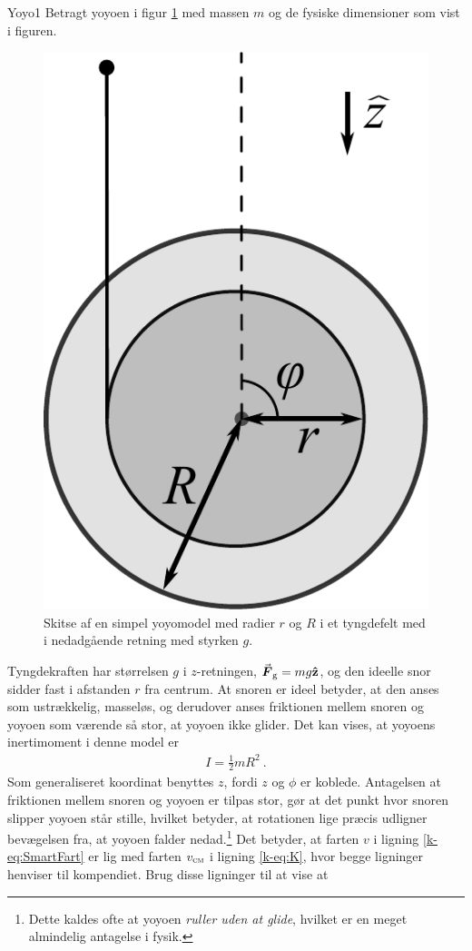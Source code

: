 \begin{opgave}{Yoyo}{1} \label{opg:Yoyo}
Betragt yoyoen i figur \ref{fig:yoyo} med massen $m$ og de fysiske dimensioner som vist i figuren.
%
\begin{figure}[]
	\centering
	\includegraphics[width=.61\columnwidth]{Analytisk-Mekanik/yoyo.pdf}
	\caption{Skitse af en simpel yoyomodel med radier $r$ og $R$ i et tyngdefelt med i nedadgående retning med styrken $g$.} \label{fig:yoyo}
\end{figure}
%
Tyngdekraften har størrelsen $g$ i $z$-retningen, ${\vec{\boldsymbol{F}}}_\mathrm{g} = mg\mathbf{\hat{z}}$, og den ideelle snor sidder fast i afstanden $r$ fra centrum. At snoren er ideel betyder, at den anses som ustrækkelig, masseløs, og derudover anses friktionen mellem snoren og yoyoen som værende så stor, at yoyoen ikke glider. Det kan vises, at yoyoens inertimoment i denne model er
\begin{align*}
	I = \frac{1}{2}mR^2 \: .
\end{align*}
Som generaliseret koordinat benyttes $z$, fordi $z$ og $\phi$ er koblede.
\opg Antagelsen at friktionen mellem snoren og yoyoen er tilpas stor, gør at det punkt hvor snoren slipper yoyoen står stille, hvilket betyder, at rotationen lige præcis udligner bevægelsen fra, at yoyoen falder nedad.\footnote{Dette kaldes ofte at yoyoen \textit{ruller uden at glide}, hvilket er en meget almindelig antagelse i fysik.} Det betyder, at farten $v$ i ligning \eqref{k-eq:SmartFart} er lig med farten $v_\textsc{cm}$ i ligning \eqref{k-eq:K}, hvor begge ligninger henviser til kompendiet. Brug disse ligninger til at vise at

\end{opgave}
